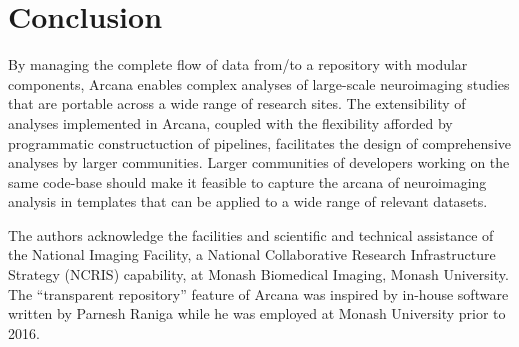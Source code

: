 \documentclass[smallextended]{svjour3}       %
\begin{document}
\section*{Conclusion}
\label{conclusion}

By managing the complete flow of data from/to a repository with modular
components, Arcana enables complex analyses of large-scale neuroimaging
studies that are portable across a wide range of research sites. The
extensibility of analyses implemented in Arcana, coupled with the
flexibility afforded by programmatic constructuction of pipelines,
facilitates the design of comprehensive analyses by larger communities.
Larger communities of developers working on the same code-base should
make it feasible to capture the arcana of neuroimaging analysis in
templates that can be applied to a wide range of relevant datasets.

\begin{acknowledgements}
The authors acknowledge the facilities and scientific and technical assistance
of the National Imaging Facility, a National Collaborative Research
Infrastructure Strategy (NCRIS) capability, at Monash Biomedical Imaging,
Monash University. The ``transparent repository'' feature of Arcana was
inspired by in-house software written by Parnesh Raniga while he was
employed at Monash University prior to 2016.
\end{acknowledgements}

 

\end{document}
